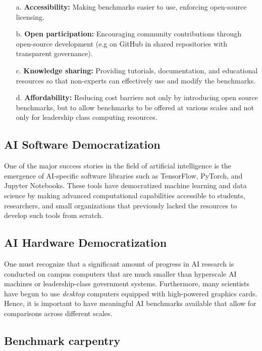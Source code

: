 \begin{enumerate}
\item[a.] {\bf Accessibility:} Making benchmarks easier to use, enforcing  open-source licensing.

\item[b.] {\bf Open participation:} Encouraging community contributions through open-source development (e.g on GitHub in shared repositories with transparent governance).

\item [c.] {\bf Knowledge sharing:} Providing tutorials, documentation, and educational resources so that non-experts can effectively use and modify the benchmarks.

\item[d.] {\bf Affordability:} Reducing cost barriers not only by introducing open source benchmarks, but to allow benchmarks to be offered at various scales and not only for leadership class computing resources.

\end{enumerate}


\subsection{AI Software Democratization}

One of the major success stories in the field of artificial intelligence is the emergence of AI-specific software libraries such as TensorFlow, PyTorch, and Jupyter Notebooks. These tools have democratized machine learning and data science by making advanced computational capabilities accessible to students, researchers, and small organizations that previously lacked the resources to develop such tools from scratch.

\subsection{AI Hardware Democratization}

One must recognize that a significant amount of progress in AI research is conducted on campus computers that are much smaller than hyperscale AI machines or leadership-class government systems. Furthermore, many scientists have begun to use {\em desktop} computers equipped with high-powered graphics cards. Hence, it is important to have meaningful AI benchmarks available that allow for comparisons across different scales.



\subsection{Benchmark carpentry}
\label{sec:benchmark-carpentry}

